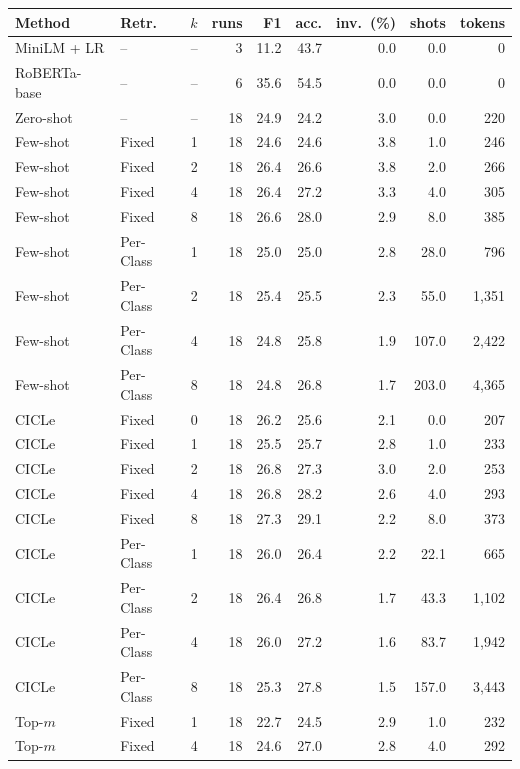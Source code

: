 \begin{tabular}{llrrrrrrr}
\toprule
Method & Retr. & $k$ & runs & F1 & acc. & inv.\ (\%) & shots & tokens \\
\midrule
MiniLM + LR & -- & -- & 3 & 11.2 & 43.7 & 0.0 & 0.0 & 0 \\
RoBERTa-base & -- & -- & 6 & 35.6 & 54.5 & 0.0 & 0.0 & 0 \\
\midrule
Zero-shot & -- & -- & 18 & 24.9 & 24.2 & 3.0 & 0.0 & 220 \\
\midrule
Few-shot & Fixed & 1 & 18 & 24.6 & 24.6 & 3.8 & 1.0 & 246 \\
Few-shot & Fixed & 2 & 18 & 26.4 & 26.6 & 3.8 & 2.0 & 266 \\
Few-shot & Fixed & 4 & 18 & 26.4 & 27.2 & 3.3 & 4.0 & 305 \\
Few-shot & Fixed & 8 & 18 & 26.6 & 28.0 & 2.9 & 8.0 & 385 \\
Few-shot & Per-Class & 1 & 18 & 25.0 & 25.0 & 2.8 & 28.0 & 796 \\
Few-shot & Per-Class & 2 & 18 & 25.4 & 25.5 & 2.3 & 55.0 & 1,351 \\
Few-shot & Per-Class & 4 & 18 & 24.8 & 25.8 & 1.9 & 107.0 & 2,422 \\
Few-shot & Per-Class & 8 & 18 & 24.8 & 26.8 & 1.7 & 203.0 & 4,365 \\
CICLe & Fixed & 0 & 18 & 26.2 & 25.6 & 2.1 & 0.0 & 207 \\
CICLe & Fixed & 1 & 18 & 25.5 & 25.7 & 2.8 & 1.0 & 233 \\
CICLe & Fixed & 2 & 18 & 26.8 & 27.3 & 3.0 & 2.0 & 253 \\
CICLe & Fixed & 4 & 18 & 26.8 & 28.2 & 2.6 & 4.0 & 293 \\
CICLe & Fixed & 8 & 18 & 27.3 & 29.1 & 2.2 & 8.0 & 373 \\
CICLe & Per-Class & 1 & 18 & 26.0 & 26.4 & 2.2 & 22.1 & 665 \\
CICLe & Per-Class & 2 & 18 & 26.4 & 26.8 & 1.7 & 43.3 & 1,102 \\
CICLe & Per-Class & 4 & 18 & 26.0 & 27.2 & 1.6 & 83.7 & 1,942 \\
CICLe & Per-Class & 8 & 18 & 25.3 & 27.8 & 1.5 & 157.0 & 3,443 \\
\midrule
Top-$m$ & Fixed & 1 & 18 & 22.7 & 24.5 & 2.9 & 1.0 & 232 \\
Top-$m$ & Fixed & 4 & 18 & 24.6 & 27.0 & 2.8 & 4.0 & 292 \\

\end{tabular}
